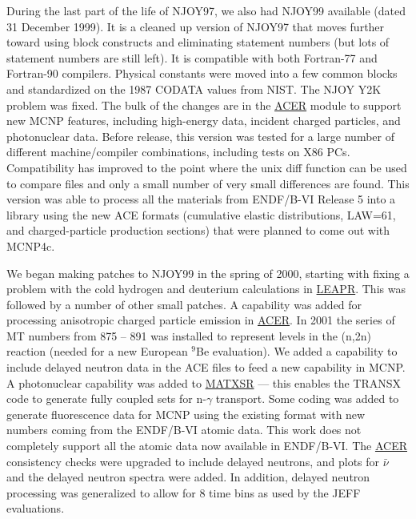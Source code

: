 During the last part of the life of NJOY97, we also
had NJOY99 available (dated 31 December 1999).  It is
a cleaned up version of NJOY97 that moves further
toward using block constructs and eliminating statement numbers
(but lots of statement numbers are still left).  It is compatible
with both Fortran-77 and Fortran-90 compilers.  Physical constants
were moved into a few common blocks and standardized on the 1987
CODATA values from NIST.  The NJOY Y2K problem was fixed.  The bulk
of the changes are in the \hyperlink{sACERhy}{ACER}
module to support new MCNP features, including
high-energy data, incident charged particles, and photonuclear
data.  Before release, this version was tested for a large number of
different machine/compiler combinations, including tests on X86
PCs.  Compatibility has improved to the point where the unix diff
function can be used to compare files and only a small number of
very small differences are found.  This version was able to
process all the materials from ENDF/B-VI Release 5 into a library
using the new ACE formats (cumulative elastic distributions,
LAW=61, and charged-particle production sections) that were
planned to come out with MCNP4c.

We began making patches to NJOY99 in the spring
of 2000, starting with fixing a problem with the cold hydrogen
and deuterium calculations in
\hyperlink{sLEAPRhy}{LEAPR}.  This was
followed by a number of other small patches.  A capability
was added for processing anisotropic charged particle emission
in \hyperlink{sACERhy}{ACER}.  In 2001 the
series of MT numbers from 875 -- 891
was installed to represent levels in the (n,2n) reaction
(needed for a new European $^{9}$Be evaluation).  We added a capability
to include delayed neutron data in the ACE files to feed a new
capability in MCNP. A photonuclear capability was added
to \hyperlink{sMATXSRhy}{MATXSR} --- this enables
the TRANSX code to generate fully coupled sets
for n\nobreakdash-$\gamma$ transport.  Some
coding was added to generate fluorescence data for MCNP
using the existing format with new numbers coming from the ENDF/B-VI
atomic data.  This work does not completely support all the
atomic data now available in ENDF/B-VI.  The
\hyperlink{sACERhy}{ACER}
consistency checks were upgraded to include delayed neutrons, and
plots for $\bar{\nu}$ and the delayed neutron spectra were added.  In
addition, delayed neutron processing was generalized to allow
for 8 time bins as used by the JEFF evaluations.

